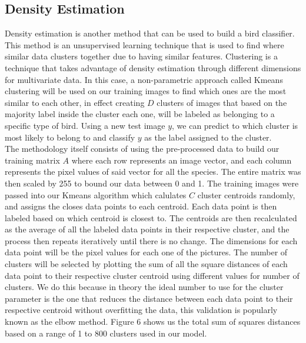 \documentclass[11pt]{article}
\begin{document}
\begin{singlespace}
\subsection{Density Estimation}

Density estimation is another method that can be used to build a bird classifier. This method is an unsupervised learning technique that is used to find where similar data clusters together due to having similar features. Clustering is a technique that takes advantage of density estimation through different dimensions for multivariate data. In this case, a non-parametric approach called Kmeans clustering will be used on our training images to find which ones are the most similar to each other, in effect creating $D$ clusters of images that based on the majority label inside the cluster each one, will be labeled as belonging to a specific type of bird. Using a new test image $y$, we can predict to which cluster is most likely to belong to and classify $y$ as the label assigned to the cluster. \\

The methodology itself consists of using the pre-processed data to build our training matrix $A$ where each row represents an image vector, and each column represents the pixel values of said vector for all the species. The entire matrix was then scaled by 255 to bound our data between 0 and 1. The training images were passed into our Kmeans algorithm which calulates $C$ cluster centroids randomly, and assigns the closes data points to each centroid. Each data point is then labeled based on which centroid is closest to. The centroids are then recalculated as the average of all the labeled data points in their respective cluster, and the process then repeats iteratively until there is no change. The dimensions for each data point will be the pixel values for each one of the pictures. The number of clusters will be selected by plotting the sum of all the square distances of each data point to their respective cluster centroid using different values for number of clusters. We do this because in theory the ideal number to use for the cluster parameter is the one that reduces the distance between each data point to their respective centroid without overfitting the data, this validation is popularly known as the elbow method. Figure 6 shows us the total sum of squares distances based on a range of 1 to 800 clusters used in our model. \\


\end{singlespace}
\end{document}
